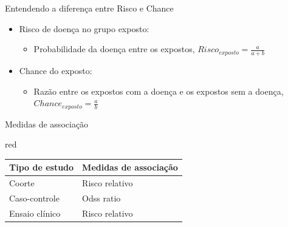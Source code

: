 \documentclass[9pt]{beamer}
\begin{document}
\begin{frame}{Entendendo a diferença entre Risco e Chance}{}

\begin{itemize}
\item Risco de doença no grupo exposto:
  \begin{itemize}
    \item Probabilidade da doença entre os expostos, $Risco_{exposto} =
 \frac{a}{a+b}$
  \end{itemize}

    \item Chance do exposto:
  \begin{itemize}
    \item Razão entre os expostos com a doença e os expostos sem a
      doença, $Chance_{exposto} = \frac{a}{b}$
  \end{itemize}

\end{itemize}

\end{frame}


\begin{frame}{Medidas de associação}{}

\begin{block}{red}{}



\begin{table}[!htb]
\centering
\begin{tabular}{ll}
\hline
\multicolumn{1}{c}{Tipo de estudo} & \multicolumn{1}{c}{Medidas de associação} \\ \hline
Coorte                               & Risco relativo                             \\
Caso-controle                        & Odss ratio                                 \\
Ensaio clínico                       & Risco relativo                             \\ \hline
\end{tabular}
\end{table}



\end{block}
\end{frame}
\end{document}
